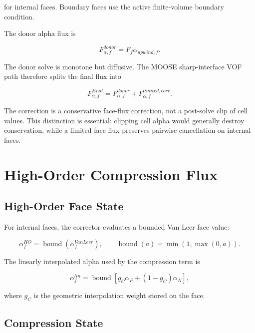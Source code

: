 \documentclass[11pt]{article}
\newcommand{\bnd}{\operatorname{bound}}
\begin{document}
for internal faces.  Boundary faces use the active finite-volume boundary
condition.

The donor alpha flux is

\begin{equation}
  F_{\alpha,f}^{donor}=F_f\alpha_{upwind,f}.
  \label{eq:donor-flux}
\end{equation}

The donor solve is monotone but diffusive.  The MOOSE sharp-interface VOF path
therefore splits the final flux into

\begin{equation}
  F_{\alpha,f}^{final}
  =
  F_{\alpha,f}^{donor}
  +
  F_{\alpha,f}^{limited,corr}.
  \label{eq:flux-split}
\end{equation}

The correction is a conservative face-flux correction, not a post-solve clip of
cell values.  This distinction is essential: clipping cell alpha would generally
destroy conservation, while a limited face flux preserves pairwise cancellation
on internal faces.

\section{High-Order Compression Flux}

\subsection{High-Order Face State}

For internal faces, the corrector evaluates a bounded Van Leer face value:

\begin{equation}
  \alpha_f^{HO}
  =
  \bnd\left(\alpha_f^{VanLeer}\right),
  \qquad
  \bnd(a)=\min(1,\max(0,a)).
\end{equation}

The linearly interpolated alpha used by the compression term is

\begin{equation}
  \alpha_f^{lin}
  =
  \bnd
  \left[
    g_C\alpha_P+(1-g_C)\alpha_N
  \right],
  \label{eq:linear-alpha-face}
\end{equation}

where \(g_C\) is the geometric interpolation weight stored on the face.

\subsection{Compression State}
\end{document}
